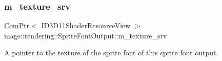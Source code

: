 \subsubsection{\texorpdfstring{m\+\_\+texture\+\_\+srv}{m\_texture\_srv}}
{\footnotesize\ttfamily \mbox{\hyperlink{namespacemage_ae74f374780900893caa5555d1031fd79}{Com\+Ptr}}$<$ I\+D3\+D11\+Shader\+Resource\+View $>$ mage\+::rendering\+::\+Sprite\+Font\+Output\+::m\+\_\+texture\+\_\+srv}

A pointer to the texture of the sprite font of this sprite font output. 